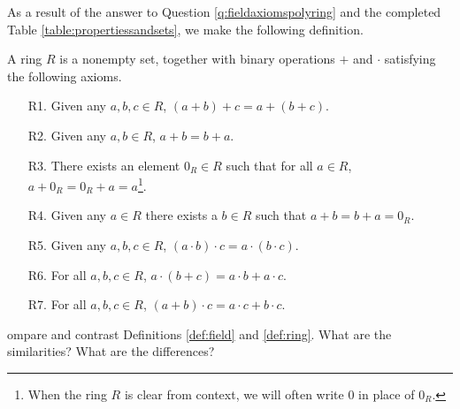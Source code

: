 \documentclass[english,course]{lecture}
\theoremstyle{plain}
\newenvironment{exercise}[1]
  {\renewcommand\theinnerexercise{#1}\innerexercise}
  {\endinnerexercise}
\newenvironment{definition}[1]
  {\renewcommand\theinnerdefinition{#1}\innerdefinition}
  {\endinnerdefinition}
\def\presnotes{}
\begin{document}
\presnotes



As a result of the answer to Question \ref{q:fieldaxiomspolyring} and the completed Table \ref{table:propertiessandsets}, we make the following definition.
















\begin{definition}\label{def:ring}
	A ring $R$ is a nonempty set, together with binary operations $+$ and $\cdot$ satisfying the following axioms.

	\begin{enumerate}
		\item[R1.] Given any $a,b,c\in R$, $(a+b)+c = a+(b+c)$. %
		\item[R2.] Given any $a,b\in R$, $a+b= b+a$. %
		\item[R3.] There exists an element $0_R\in R$ such that for all $a\in R$, $a+0_R = 0_R + a = a$\footnote{When the ring $R$ is clear from context, we will often write $0$ in place of $0_R$.}. %
		\item[R4.] Given any $a\in R$ there exists a $b\in R$ such that $a+b = b + a =0_R$.
		\item[R5.] Given any $a,b,c\in R$, $(a\cdot b)\cdot c = a\cdot (b\cdot c)$.
		\item[R6.] For all $a,b,c\in R$, $a\cdot (b+c) = a\cdot b + a\cdot c$.
		\item[R7.] For all $a,b,c\in R$, $(a+b)\cdot c = a\cdot c + b\cdot c$.
	\end{enumerate}	
\end{definition}


\begin{exercise}
	Compare and contrast Definitions \ref{def:field} and \ref{def:ring}.
	What are the similarities? What are the differences?
\end{exercise}
\end{document}
